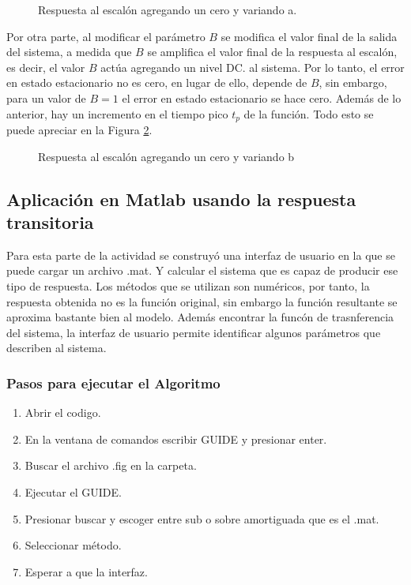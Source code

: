 \documentclass[journal]{IEEEtran}
\begin{document}
\begin{figure}[h]
\centering
\caption{Respuesta al escal\'on agregando un cero y 
variando a.}
\label{Step_response_A}
\end{figure}

Por otra parte, al modificar el par\'ametro $B$ se modifica
el valor
final de la salida del sistema, a medida que $B$ se 
amplifica el valor final de la respuesta al escal\'on, 
es decir, el valor $B$ actúa agregando un nivel DC. al 
sistema. 
Por lo tanto, el error en estado 
estacionario no es cero, en lugar de ello, depende de $B$, 
sin embargo, para un valor de $B = 1$ el error en estado estacionario se hace cero.
Adem\'as de lo anterior, hay un incremento en 
el tiempo pico $t_p$ de la funci\'on. Todo esto se puede 
apreciar en la Figura \ref{Step_response_B}. 

\begin{figure}[h]
\centering
\caption{Respuesta al escal\'on agregando un cero y 
variando b}
\label{Step_response_B}
\end{figure}

\subsection*{Aplicaci\'on en Matlab usando la respuesta 
transitoria}

Para esta parte de la actividad se construy\'o una
interfaz de usuario en la que se puede cargar un 
archivo .mat. Y calcular el sistema que es capaz de 
producir ese tipo de respuesta. Los m\'etodos que se 
utilizan son num\'ericos, por tanto, la respuesta obtenida
no es la funci\'on original, sin embargo la funci\'on 
resultante se aproxima bastante bien al modelo. Adem\'as 
encontrar la func\'on de trasnferencia del sistema, la 
interfaz de usuario permite identificar algunos 
par\'ametros que describen al sistema. \\

\subsubsection*{Pasos para ejecutar el Algoritmo}
\begin{enumerate}
\item Abrir el codigo.
\item En la ventana de comandos escribir GUIDE y 
presionar enter.
\item Buscar el archivo .fig en la carpeta. 
\item Ejecutar el GUIDE.
\item Presionar buscar y escoger entre sub o sobre amortiguada que es el .mat.
\item Seleccionar m\'etodo.
\item Esperar a que la interfaz.
\end{enumerate}
\end{document}
